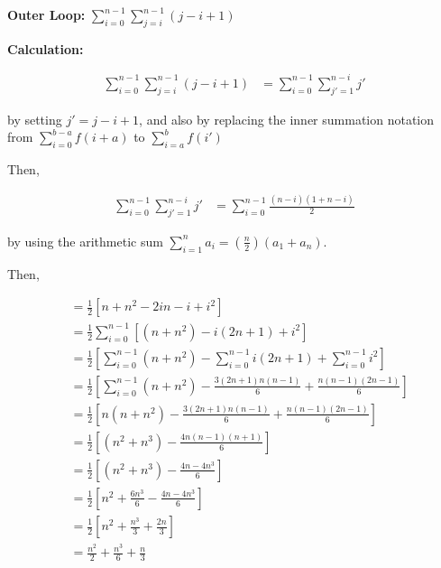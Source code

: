 \documentclass[12pt]{article}
\begin{document}
\begin{itemize}
    \textbf{Outer Loop:} $\sum\limits_{i = 0}^{n-1}\sum\limits_{j = i}^{n-1} (j - i + 1)$

    \textbf{Calculation:}

    \setcounter{equation}{0}
    \begin{align}
        \sum\limits_{i = 0}^{n-1}\sum\limits_{j = i}^{n-1} (j - i + 1) &= \sum\limits_{i = 0}^{n-1}\sum\limits_{j' = 1}^{n-i} j'
    \end{align}

    by setting $j' = j - i + 1$, and also by replacing the inner summation notation from
    $\sum\limits_{i = 0}^{b-a} f(i+a)$ to $\sum\limits_{i = a}^{b} f(i')$

    \bigskip

    Then,

    \begin{align}
        \sum\limits_{i = 0}^{n-1}\sum\limits_{j' = 1}^{n-i} j' &= \sum\limits_{i=0}^{n-1} \frac{(n-i)(1 + n - i)}{2}
    \end{align}

    by using the arithmetic sum $\sum\limits_{i=1}^n a_i = \left(\frac{n}{2}\right) (a_1 + a_n)$.

    \bigskip

    Then,

    \begin{align}
        &= \frac{1}{2} \left[ n + n^2 - 2in -i + i^2 \right]\\
        &= \frac{1}{2} \sum\limits_{i=0}^{n-1} \left[ (n + n^2) -i(2n+1) + i^2 \right]\\
        &= \frac{1}{2} \left[ \sum\limits_{i=0}^{n-1} (n + n^2) - \sum\limits_{i=0}^{n-1} i(2n+1) + \sum\limits_{i=0}^{n-1} i^2 \right]\\
        &= \frac{1}{2} \left[ \sum\limits_{i=0}^{n-1} (n + n^2) - \frac{3(2n+1)n(n-1)}{6}  + \frac{n(n-1)(2n-1)}{6} \right]\\
        &= \frac{1}{2} \left[ n(n + n^2) - \frac{3(2n+1)n(n-1)}{6}  + \frac{n(n-1)(2n-1)}{6} \right]\\
        &= \frac{1}{2} \left[ (n^2 + n^3) - \frac{4n(n-1)(n+1)}{6} \right]\\
        &= \frac{1}{2} \left[ (n^2 + n^3) - \frac{4n - 4n^3}{6} \right]\\
        &= \frac{1}{2} \left[ n^2 + \frac{6n^3}{6} - \frac{4n - 4n^3}{6} \right]\\
        &= \frac{1}{2} \left[ n^2 + \frac{n^3}{3} + \frac{2n}{3} \right]\\
        &= \frac{n^2}{2} + \frac{n^3}{6} + \frac{n}{3}
    \end{align}


\end{itemize}
\end{document}
